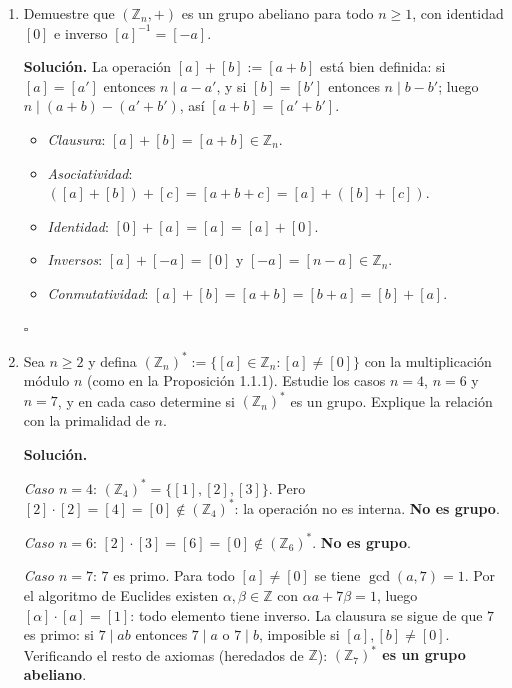 \begin{enumerate}[label=\textbf{2.\arabic*.}]
\item Demuestre que \((\mathbb{Z}_n, +)\) es un grupo abeliano para todo
\(n \geq 1\), con identidad \([0]\) e inverso \([a]^{-1} = [-a]\).

\textbf{Solución.}
La operación \([a]+[b]:=[a+b]\) está bien definida: si \([a]=[a']\) entonces
\(n \mid a-a'\), y si \([b]=[b']\) entonces \(n \mid b-b'\); luego
\(n \mid (a+b)-(a'+b')\), así \([a+b]=[a'+b']\).
\begin{itemize}
    \item \textit{Clausura}: \([a]+[b]=[a+b] \in \mathbb{Z}_n\).
    \item \textit{Asociatividad}: \(([a]+[b])+[c]=[a+b+c]=[a]+([b]+[c])\).
    \item \textit{Identidad}: \([0]+[a]=[a]=[a]+[0]\).
    \item \textit{Inversos}: \([a]+[-a]=[0]\) y \([-a]=[n-a] \in \mathbb{Z}_n\).
    \item \textit{Conmutatividad}: \([a]+[b]=[a+b]=[b+a]=[b]+[a]\).
\end{itemize}
\hfill\(\square\)

\item Sea \(n \geq 2\) y defina
\((\mathbb{Z}_n)^* := \{[a] \in \mathbb{Z}_n : [a] \neq [0]\}\)
con la multiplicación módulo \(n\) (como en la Proposición 1.1.1).
Estudie los casos \(n=4\), \(n=6\) y \(n=7\), y en cada caso determine si
\((\mathbb{Z}_n)^*\) es un grupo. Explique la relación con la primalidad de \(n\).

\textbf{Solución.}

\textit{Caso \(n=4\)}: \((\mathbb{Z}_4)^*=\{[1],[2],[3]\}\).
Pero \([2]\cdot[2]=[4]=[0] \notin (\mathbb{Z}_4)^*\): la operación no es interna.
\textbf{No es grupo}.

\textit{Caso \(n=6\)}: \([2]\cdot[3]=[6]=[0] \notin (\mathbb{Z}_6)^*\).
\textbf{No es grupo}.

\textit{Caso \(n=7\)}: \(7\) es primo. Para todo \([a] \neq [0]\) se tiene
\(\gcd(a,7)=1\). Por el algoritmo de Euclides existen \(\alpha,\beta \in \mathbb{Z}\)
con \(\alpha a + 7\beta = 1\), luego \([\alpha]\cdot[a]=[1]\): todo elemento tiene
inverso. La clausura se sigue de que \(7\) es primo: si \(7 \mid ab\) entonces
\(7 \mid a\) o \(7 \mid b\), imposible si \([a],[b] \neq [0]\).
Verificando el resto de axiomas (heredados de \(\mathbb{Z}\)):
\textbf{\((\mathbb{Z}_7)^*\) es un grupo abeliano}.


\end{enumerate}
